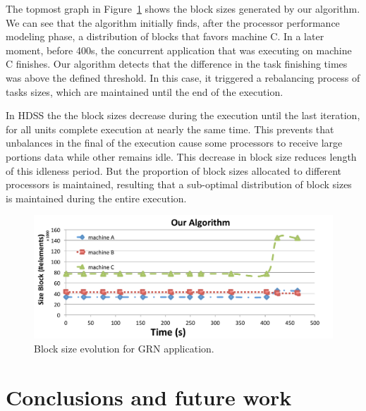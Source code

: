 \documentclass[journal]{IEEEtran}
\begin{document}
The topmost graph in Figure~\ref{fig:GeneBlocos} shows the block sizes generated
by our algorithm.  We can see that the algorithm initially finds, after the processor performance modeling phase, a distribution of blocks that favors machine C. In a later moment, before 400s, the concurrent application that was executing on machine C finishes. Our algorithm detects that the difference in the task
finishing times was above the defined threshold. In this case, it triggered a
rebalancing process of tasks sizes, which are maintained until the end of the
execution. 

In HDSS the the block sizes decrease during the execution until the last
iteration, for all units complete execution at nearly the same time. This
prevents that unbalances in the final of the execution cause some processors to
receive large portions data while other remains idle. This decrease in block
size reduces length of this idleness period. But the proportion of block sizes
allocated to different processors is maintained, resulting that a sub-optimal
distribution of block sizes is maintained during the entire execution.


\begin{figure}[htb]
	\begin{center}
	\centering
			\includegraphics[scale=0.33]{Block_Comportamento_Nosso.pdf}%
	\caption{Block size evolution for GRN application.}
	\label{fig:GeneBlocos}
	\end{center}
\end{figure}


\section{Conclusions and future work}
\end{document}
